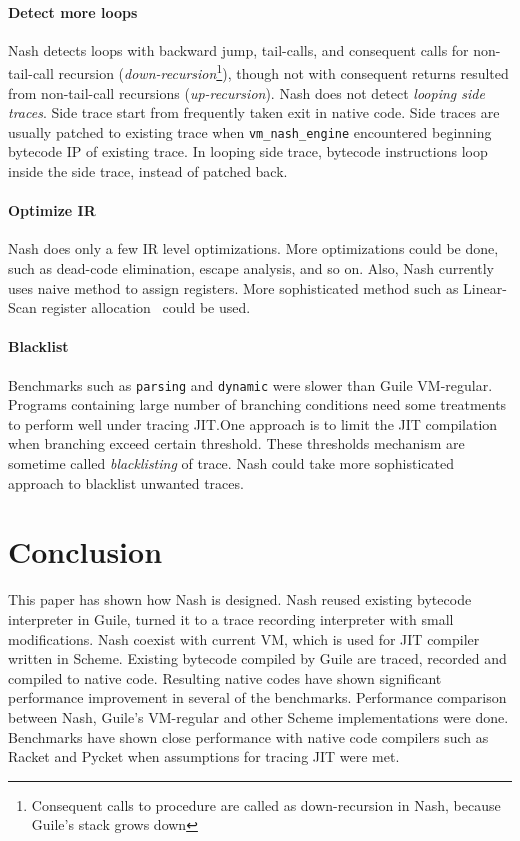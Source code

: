 \documentclass[preprint, 10pt]{sigplanconf}
\begin{document}
\paragraph{Detect more loops} Nash detects loops with backward jump,
tail-calls, and consequent calls for non-tail-call recursion
(\textit{down-recursion}\footnote{Consequent calls to procedure are called as
  down-recursion in Nash, because Guile's stack grows down}), though not with
consequent returns resulted from non-tail-call recursions
(\textit{up-recursion}). Nash does not detect \textit{looping side traces}. Side
trace start from frequently taken exit in native code. Side traces are usually
patched to existing trace when \texttt{vm\_nash\_engine} encountered beginning
bytecode IP of existing trace. In looping side trace, bytecode instructions loop
inside the side trace, instead of patched back.

\paragraph{Optimize IR} Nash does only a few IR level optimizations.
More optimizations could be done, such as dead-code elimination, escape
analysis, and so on. Also, Nash currently uses naive method to assign
registers. More sophisticated method such as Linear-Scan register
allocation~\cite{poletto1999linear} could be used.

\paragraph{Blacklist} Benchmarks such as \texttt{parsing} and
\texttt{dynamic} were slower than Guile VM-regular. Programs containing large
number of branching conditions need some treatments to perform well under
tracing JIT.\@ One approach is to limit the JIT compilation when branching
exceed certain threshold. These thresholds mechanism are sometime called
\textit{blacklisting} of trace. Nash could take more sophisticated approach to
blacklist unwanted traces.

\section{Conclusion}
\label{sec:conclusion}
This paper has shown how Nash is designed. Nash reused existing bytecode
interpreter in Guile, turned it to a trace recording interpreter with small
modifications. Nash coexist with current VM, which is used for JIT compiler
written in Scheme. Existing bytecode compiled by Guile are traced, recorded and
compiled to native code. Resulting native codes have shown significant
performance improvement in several of the benchmarks. Performance comparison
between Nash, Guile's VM-regular and other Scheme implementations were
done. Benchmarks have shown close performance with native code compilers such as
Racket and Pycket when assumptions for tracing JIT were met.
\end{document}
